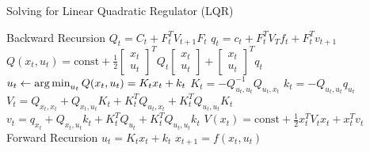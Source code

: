 \begin{algorithm}[t!]
\caption{Solving for Linear Quadratic Regulator (LQR)}
\begin{algorithmic}[1]
\label{alg:lqr}
\STATE Backward Recursion
    \STATE $Q_t = C_t + F_t^TV_{t+1}F_t$
    \STATE $q_{t} = c_{t} +  F^T_{t}V_Tf_{t} + F^T_{t}v_{t+1}$
    \STATE $Q(x_{t}, u_{t}) = \text{const} +\frac{1}{2} \begin{bmatrix}x_{t}\\u_{t}\end{bmatrix}^TQ_{t}\begin{bmatrix}x_{t}\\u_{t}\end{bmatrix} + \begin{bmatrix}x_{t}\\u_{t}\end{bmatrix}^Tq_{t}$
    \STATE $u_t\leftarrow \operatorname*{arg\,min}_{u_t}Q(x_t,u_t) = K_tx_t + k_t$
    \STATE $K_{t} = -Q^{-1}_{u_{t},u_{t}}Q_{u_{t},x_{t}}$
    \STATE $k_{t} = -Q_{u_{t},u_{t}}q_{u_{t}}$
    \STATE $V_t = Q_{x_t,x_t} + Q_{x_t,u_t}K_t + K^T_tQ_{u_t,x_t} + K_t^TQ_{u_t,u_t}K_t$
    \STATE $v_t = q_{x_t} + Q_{x_t,u_t}k_t + K_t^TQ_{u_t} + K^T_tQ_{u_t,u_t}k_t$
    \STATE $V(x_t) = \text{const} + \frac{1}{2}x_t^TV_tx_t + x_t^Tv_t$
\ENDFOR
\STATE Forward Recursion
    \STATE $u_t = K_tx_t + k_t$
    \STATE $x_{t+1} = f(x_t,u_t)$
\ENDFOR
\end{algorithmic}
\end{algorithm}